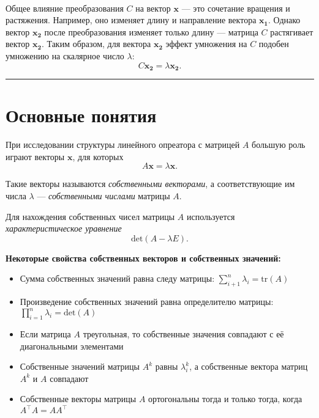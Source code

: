 \documentclass[11pt,a4paper]{article}
\renewcommand{\linethickness}{0.1ex}
\providecommand{\tightlist}{%
      \setlength{\itemsep}{0pt}\setlength{\parskip}{0pt}}
\begin{document}
    \begin{center}
    \end{center}
    { \hspace*{\fill} \\}
    
    Общее влияние преобразования \(C\) на вектор \(\mathbf{x}\) --- это
сочетание вращения и растяжения. Например, оно изменяет длину и
направление вектора \(\mathbf{x_1}\). Однако вектор \(\mathbf{x_2}\)
после преобразования изменяет только длину --- матрица \(C\) растягивает
вектор \(\mathbf{x_2}\). Таким образом, для вектора \(\mathbf{x_2}\)
эффект умножения на \(C\) подобен умножению на скалярное число
\(\lambda\): \[ C\mathbf{x_2} = \lambda \mathbf{x_2}. \]

    \begin{center}\rule{0.5\linewidth}{\linethickness}\end{center}

    \hypertarget{ux43eux441ux43dux43eux432ux43dux44bux435-ux43fux43eux43dux44fux442ux438ux44f}{%
\section{Основные
понятия}\label{ux43eux441ux43dux43eux432ux43dux44bux435-ux43fux43eux43dux44fux442ux438ux44f}}

При исследовании структуры линейного опреатора с матрицей \(A\) большую
роль играют векторы \(\mathbf{x}\), для которых
\[ A\mathbf{x} = \lambda\mathbf{x}. \]

Такие векторы называются \emph{собственными векторами}, а
соответствующие им числа \(\lambda\) --- \emph{собственными числами}
матрицы \(A\).

Для нахождения собственных чисел матрицы \(A\) используется
\emph{характеристическое уравнение} \[ \mathrm{det}(A - \lambda E). \]

\textbf{Некоторые свойства собственных векторов и собственных значений:}

\begin{itemize}
\tightlist
\item
  Сумма собственных значений равна следу матрицы:
  \(\sum\limits_{i+1}^{n} \lambda_i = \mathrm{tr}(A)\)
\item
  Произведение собственных значений равна определителю матрицы:
  \(\prod\limits_{i=1}^n \lambda_i = \mathrm{det}(A)\)
\item
  Если матрица \(A\) треугольная, то собственные значения совпадают с её
  диагональными элементами
\item
  Собственные значений матрицы \(A^k\) равны \(\lambda_i^k\), а
  собственные вектора матриц \(A^k\) и \(A\) совпадают
\item
  Собственные векторы матрицы \(A\) ортогональны тогда и только тогда,
  когда \(A^\top A = A A^\top\)
\end{itemize}
\end{document}
